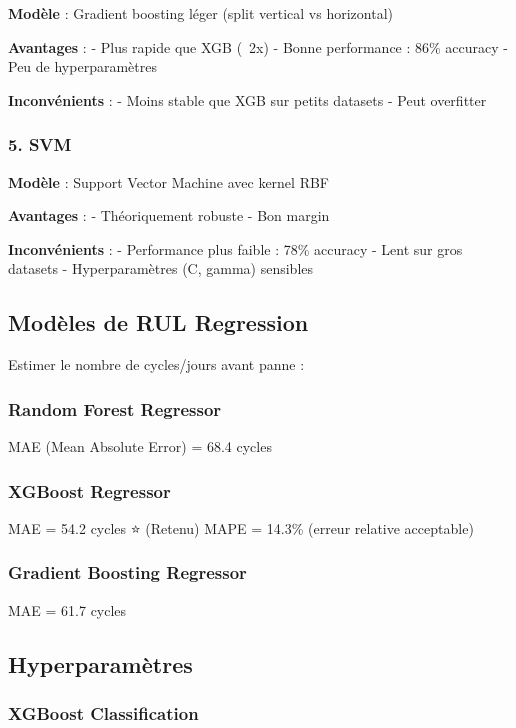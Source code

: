 \documentclass[12pt,a4paper,french]{article}
\begin{document}
\textbf{Modèle} : Gradient boosting léger (split vertical vs horizontal)

\textbf{Avantages} :
- Plus rapide que XGB (~2x)
- Bonne performance : 86\% accuracy
- Peu de hyperparamètres

\textbf{Inconvénients} :
- Moins stable que XGB sur petits datasets
- Peut overfitter

\subsubsection{5. SVM}

\textbf{Modèle} : Support Vector Machine avec kernel RBF

\textbf{Avantages} :
- Théoriquement robuste
- Bon margin

\textbf{Inconvénients} :
- Performance plus faible : 78\% accuracy
- Lent sur gros datasets
- Hyperparamètres (C, gamma) sensibles

\subsection{Modèles de RUL Regression}

Estimer le nombre de cycles/jours avant panne :

\subsubsection{Random Forest Regressor}

MAE (Mean Absolute Error) = 68.4 cycles

\subsubsection{XGBoost Regressor}

MAE = 54.2 cycles ⭐ (Retenu)
MAPE = 14.3\% (erreur relative acceptable)

\subsubsection{Gradient Boosting Regressor}

MAE = 61.7 cycles

\subsection{Hyperparamètres}

\subsubsection{XGBoost Classification}
\end{document}
